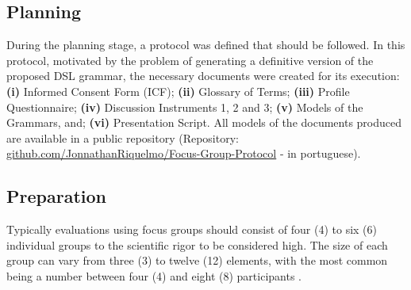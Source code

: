 \documentclass[a4paper,twoside,anonymous]{article}
\begin{document}
\subsection{Planning}

During the planning stage, a protocol was defined that should be followed.
In this protocol, motivated by the problem of generating a definitive version of the proposed DSL grammar, the necessary documents were created for its execution:
\textbf{(i)} Informed Consent Form (ICF); 
\textbf{(ii)} Glossary of Terms; 
\textbf{(iii)} Profile Questionnaire; 
\textbf{(iv)} Discussion Instruments 1, 2 and 3; 
\textbf{(v)} Models of the Grammars, and; 
\textbf{(vi)} Presentation Script.
All models of the documents produced are available in a public repository (Repository: \url{github.com/JonnathanRiquelmo/Focus-Group-Protocol} - in portuguese).

\subsection{Preparation}

Typically evaluations using focus groups should consist of four (4) to six (6) individual groups to the scientific rigor to be considered high.
The size of each group can vary from three (3) to twelve (12) elements, with the most common being a number between four (4) and eight (8) participants \cite{Kontio:2008}.
\end{document}
